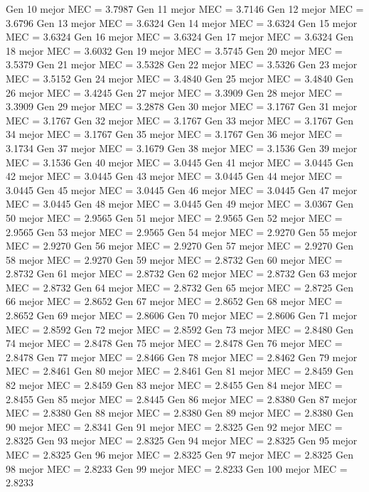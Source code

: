 Gen 10 mejor MEC = 3.7987
Gen 11 mejor MEC = 3.7146
Gen 12 mejor MEC = 3.6796
Gen 13 mejor MEC = 3.6324
Gen 14 mejor MEC = 3.6324
Gen 15 mejor MEC = 3.6324
Gen 16 mejor MEC = 3.6324
Gen 17 mejor MEC = 3.6324
Gen 18 mejor MEC = 3.6032
Gen 19 mejor MEC = 3.5745
Gen 20 mejor MEC = 3.5379
Gen 21 mejor MEC = 3.5328
Gen 22 mejor MEC = 3.5326
Gen 23 mejor MEC = 3.5152
Gen 24 mejor MEC = 3.4840
Gen 25 mejor MEC = 3.4840
Gen 26 mejor MEC = 3.4245
Gen 27 mejor MEC = 3.3909
Gen 28 mejor MEC = 3.3909
Gen 29 mejor MEC = 3.2878
Gen 30 mejor MEC = 3.1767
Gen 31 mejor MEC = 3.1767
Gen 32 mejor MEC = 3.1767
Gen 33 mejor MEC = 3.1767
Gen 34 mejor MEC = 3.1767
Gen 35 mejor MEC = 3.1767
Gen 36 mejor MEC = 3.1734
Gen 37 mejor MEC = 3.1679
Gen 38 mejor MEC = 3.1536
Gen 39 mejor MEC = 3.1536
Gen 40 mejor MEC = 3.0445
Gen 41 mejor MEC = 3.0445
Gen 42 mejor MEC = 3.0445
Gen 43 mejor MEC = 3.0445
Gen 44 mejor MEC = 3.0445
Gen 45 mejor MEC = 3.0445
Gen 46 mejor MEC = 3.0445
Gen 47 mejor MEC = 3.0445
Gen 48 mejor MEC = 3.0445
Gen 49 mejor MEC = 3.0367
Gen 50 mejor MEC = 2.9565
Gen 51 mejor MEC = 2.9565
Gen 52 mejor MEC = 2.9565
Gen 53 mejor MEC = 2.9565
Gen 54 mejor MEC = 2.9270
Gen 55 mejor MEC = 2.9270
Gen 56 mejor MEC = 2.9270
Gen 57 mejor MEC = 2.9270
Gen 58 mejor MEC = 2.9270
Gen 59 mejor MEC = 2.8732
Gen 60 mejor MEC = 2.8732
Gen 61 mejor MEC = 2.8732
Gen 62 mejor MEC = 2.8732
Gen 63 mejor MEC = 2.8732
Gen 64 mejor MEC = 2.8732
Gen 65 mejor MEC = 2.8725
Gen 66 mejor MEC = 2.8652
Gen 67 mejor MEC = 2.8652
Gen 68 mejor MEC = 2.8652
Gen 69 mejor MEC = 2.8606
Gen 70 mejor MEC = 2.8606
Gen 71 mejor MEC = 2.8592
Gen 72 mejor MEC = 2.8592
Gen 73 mejor MEC = 2.8480
Gen 74 mejor MEC = 2.8478
Gen 75 mejor MEC = 2.8478
Gen 76 mejor MEC = 2.8478
Gen 77 mejor MEC = 2.8466
Gen 78 mejor MEC = 2.8462
Gen 79 mejor MEC = 2.8461
Gen 80 mejor MEC = 2.8461
Gen 81 mejor MEC = 2.8459
Gen 82 mejor MEC = 2.8459
Gen 83 mejor MEC = 2.8455
Gen 84 mejor MEC = 2.8455
Gen 85 mejor MEC = 2.8445
Gen 86 mejor MEC = 2.8380
Gen 87 mejor MEC = 2.8380
Gen 88 mejor MEC = 2.8380
Gen 89 mejor MEC = 2.8380
Gen 90 mejor MEC = 2.8341
Gen 91 mejor MEC = 2.8325
Gen 92 mejor MEC = 2.8325
Gen 93 mejor MEC = 2.8325
Gen 94 mejor MEC = 2.8325
Gen 95 mejor MEC = 2.8325
Gen 96 mejor MEC = 2.8325
Gen 97 mejor MEC = 2.8325
Gen 98 mejor MEC = 2.8233
Gen 99 mejor MEC = 2.8233
Gen 100 mejor MEC = 2.8233


